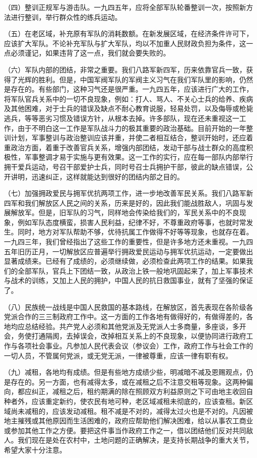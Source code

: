 （四）整训正规军与游击队。一九四五年，应将全部军队轮番整训一次，按照新方法进行整训，举行群众性的练兵运动。

（五）在老区域，补充原有军队的消耗数额。在新发展区域，在经济条件许可下，应该扩大军队。不论补充军队与扩大军队，均以不加重人民财政负担为条件，这一点必须谨记，如果违背了这一点，我们就会要失败的。

（六）军队内部的团结，非常之重要。我们八路军新四军，历来依靠官兵一致，获得了光辉的胜利。但是，中国军阀军队的军阀主义习气在我们军队里的影响，仍然是存在的。有些部门，这种习气还是很严重。一九四五年，应该进行广大的工作，将军队官兵关系中的一切不良现象，例如：打人、骂人、不关心士兵的给养、疾病及其他困难，对于士兵的错误及缺点不耐心教育说服，轻易处罚，以及侮辱或枪毙逃兵，等等恶劣习惯及错误方针，从根本去掉。许多部队，现在还未重视这一工作，由于不明白这一工作是军队战斗力的极其重要的政治基础。目前开始的一年整训计划，军事整训与政治整训应该并重，并使二者相互结合，整训开始时，还应着重政治方面，着重于改善官兵关系，增强内部团结，发动干部与战士群众的高度积极性，军事整调才易于实施与更有效果。这一工作的实行，应在每一部队内部举行拥干爱兵运动，号召干部爱护士兵，同时号召士兵拥护干部，彼此的缺点错误，公开讲明，迅速纠正，这样就能达到很好的团结内部之目的。

（七）加强拥政爱民与拥军优抗两项工作，进一步地改善军民关系。我们八路军新四军和我们解放区人民之间的关系，历来是好的，因此我们能战胜敌人，巩固与发展解放军。但是，旧军队的习气，同样地会传染给我们的，军民关系中的不良现象，例如军队态度横蛮，损害人民利益，纪律不好，不尊重政府等事，也就时常发生。同时，地方对军队帮助不够，优待抗属工作做得不好等等现象，也就存在着。一九四三年，我们曾经指出了这些工作的重要性，但是许多地方还未重视。一九四五年旧历正月，一切解放区应普遍举行拥政爱民运动与拥军优抗运动，一定要做出显著成绩来。已经有了成绩的，必须继续做，必须检查此两项工作的结果。如果我们的全部军队，官兵上下团结一致，从政治上铁一般地巩固起来了，加上军事技术与战术的训练，又加上人民的拥护，中国人民的抗日救国事业，就有了坚强的保证了。

（八）民族统一战线是中国人民救国的基本路线，在解放区，首先表现在各阶级各党派合作的三三制政府工作中。这一方面的工作各地有做得好的，有做得差的，各地均应总结经验。共产党人必须和其他党派及无党派人士多商量，多座谈，多开会，务使打通隔阂，去掉误会，改掉相互关系上的不良现象，以便协同进行政府工作与各项社会事业。凡参加人民代表会议（参议会）工作，政府工作与社会工作的一切人员，不管属何党派，或无党无派，一律被尊重，应该一律有职有权。

（九）减租，各地均有成绩。但是有些地方成绩少些，明减暗不减及恩赐观点，仍是存在的。另一方面，也有减得太多，或在减租之后不注意交租等现象。这两种偏向，都应纠正，减租之后，租约期满的除在照顾双方利益原则之下可由地主收回自种者外，应该重定新约，使农民有地可种，老区域减租未彻底的，应该查租。新区域尚未减租的，应该发动减租。租不减是不对的，减得太过火也是不对的。凡因被地主摧残或其他原因而生活困难的，政府应帮助他们解决困难，给以从事农工商业或参加其他工作之方便。要把这件事当作政府工作之一，借以团结他们反对共同敌人。我们现在是处在农村中，土地问题的正确解决，是支持长期战争的重大关节，希望大家十分注意。

